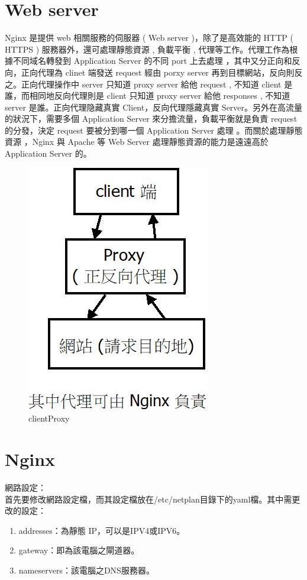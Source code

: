 \documentclass[14pt,a4paper]{report}  %
\begin{document}
\section{Web server}
 Nginx 是提供 web 相關服務的伺服器 ( Web server )，除了是高效能的 HTTP ( HTTPS ) 服務器外，還可處理靜態資源 , 負載平衡 , 代理等工作。代理工作為根據不同域名轉發到 Application Server 的不同 port 上去處理 ，其中又分正向和反向，正向代理為 clinet 端發送 request 經由 porxy server 再到目標網站，反向則反之。正向代理操作中 server 只知道 proxy server  給他 request , 不知道 client 是誰，而相同地反向代理則是 client 只知道 proxy server 給他 responses , 不知道 server 是誰。正向代理隐藏真實 Client，反向代理隱藏真實 Server。另外在高流量的狀況下，需要多個 Application Server 來分擔流量，負載平衡就是負責 request 的分發，決定 request 要被分到哪一個 Application Server 處理 。而關於處理靜態資源 ，Nginx 與 Apache 等 Web Server 處理靜態資源的能力是遠遠高於 Application Server 的。\\
 \begin{figure}[hbt!]
\begin{center}
\includegraphics[scale=0.74]{clientProxy}
\caption{\Large clientProxy}\label{clientProxy}
\end{center}
\end{figure}

\section{Nginx}
\hspace{-1.7em} 網路設定：\\
 首先要修改網路設定檔，而其設定檔放在/etc/netplan目錄下的yaml檔。其中需更改的設定：
\begin{enumerate}
\item addresses：為靜態 IP，可以是IPV4或IPV6。
\item gateway：即為該電腦之閘道器。
\item nameservers：該電腦之DNS服務器。
\end{enumerate}
\end{document}

